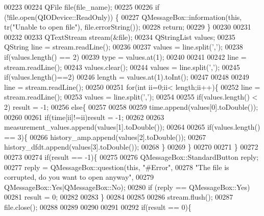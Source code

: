 \begin{DoxyCode}
00223 
00224         QFile file(file\_name);
00225 
00226         \textcolor{keywordflow}{if} (!file.open(QIODevice::ReadOnly)) \{
00227             QMessageBox::information(\textcolor{keyword}{this}, tr(\textcolor{stringliteral}{"Unable to open file"}), file.errorString());
00228             \textcolor{keywordflow}{return};
00229         \}
00230 
00231 
00232 
00233         QTextStream stream(&file);
00234         QStringList values;
00235         QString line = stream.readLine();
00236 
00237         values = line.split(\textcolor{charliteral}{','});
00238         \textcolor{keywordflow}{if}(values.length() == 2)
00239         type = values.at(1);
00240 
00241 
00242         line = stream.readLine();
00243         values.clear();
00244         values = line.split(\textcolor{charliteral}{','});
00245         \textcolor{keywordflow}{if}(values.length()==2)
00246         length = values.at(1).toInt();
00247 
00248 
00249             line = stream.readLine();
00250 
00251             \textcolor{keywordflow}{for}(\textcolor{keywordtype}{int} ii=0;ii< length;ii++)\{
00252                 line = stream.readLine();
00253                 values = line.split(\textcolor{charliteral}{','});
00254 
00255                 \textcolor{keywordflow}{if}(values.length() < 2) result = -1;
00256                 \textcolor{keywordflow}{else}\{
00257 
00258 
00259                 time.append(values[0].toDouble());
00260 
00261                 \textcolor{keywordflow}{if}(time[ii]!=ii)result = -1;
00262 
00263                 measurement\_values.append(values[1].toDouble());
00264 
00265                 \textcolor{keywordflow}{if}(values.length() == 3)\{
00266                  history\_amp.append(values[2].toDouble());
00267                  history\_dfdt.append(values[3].toDouble());
00268                 \}
00269                 \}
00270 
00271             \}
00272 
00273 
00274             \textcolor{keywordflow}{if}(result == -1)\{
00275 
00276                  QMessageBox::StandardButton reply;
00277                  reply = QMessageBox::question(\textcolor{keyword}{this}, \textcolor{stringliteral}{"#Error"},
00278                                                \textcolor{stringliteral}{"The file is corrupted, do you want to open anyway"},
00279                                                QMessageBox::Yes|QMessageBox::No);
00280                  \textcolor{keywordflow}{if} (reply == QMessageBox::Yes)
00281                   result = 0;
00282 
00283             \}
00284 
00285 
00286        stream.flush();
00287        file.close();
00288 
00289 
00290 
00291 
00292         \textcolor{keywordflow}{if}(result == 0)\{

\end{DoxyCode}
